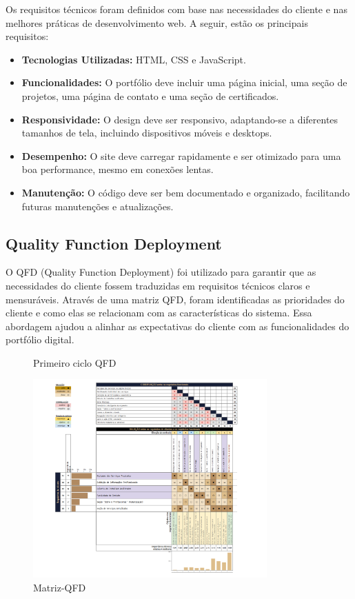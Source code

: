 Os requisitos técnicos foram definidos com base nas necessidades do cliente e nas melhores práticas de desenvolvimento web. A seguir, estão os principais requisitos:
\begin{itemize}
    \item \textbf{Tecnologias Utilizadas:} HTML, CSS e JavaScript.
    \item \textbf{Funcionalidades:} O portfólio deve incluir uma página inicial, uma seção de projetos, uma página de contato e uma seção de certificados.
    \item \textbf{Responsividade:} O design deve ser responsivo, adaptando-se a diferentes tamanhos de tela, incluindo dispositivos móveis e desktops.
    \item \textbf{Desempenho:} O site deve carregar rapidamente e ser otimizado para uma boa performance, mesmo em conexões lentas.
    \item \textbf{Manutenção:} O código deve ser bem documentado e organizado, facilitando futuras manutenções e atualizações.
\end{itemize}

\subsection{Quality Function Deployment}

O QFD (Quality Function Deployment) foi utilizado para garantir que as necessidades do cliente fossem traduzidas em requisitos técnicos claros e mensuráveis. Através de uma matriz QFD, foram identificadas as prioridades do cliente e como elas se relacionam com as características do sistema. Essa abordagem ajudou a alinhar as expectativas do cliente com as funcionalidades do portfólio digital.

 \begin{figure} [H]	
     \centering
     \caption{ Primeiro ciclo QFD}
     \includegraphics[width=0.8\textwidth]{Figures/matrizqfd.png}
     \caption*{Matriz-QFD}
     \label{fig:QFD}
\end{figure}
   

